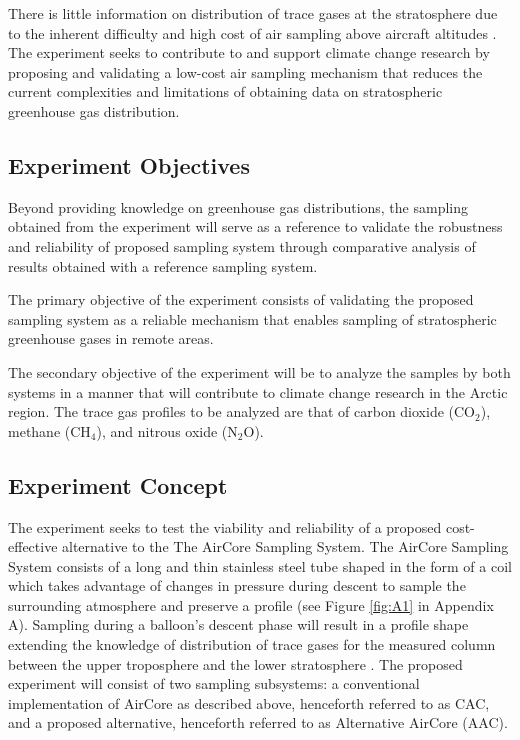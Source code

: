 \documentclass[a4paper,12pt,twoside]{article}
\begin{document}
There is little information on distribution of trace gases at the stratosphere due to the inherent difficulty and high cost of air sampling above aircraft altitudes \cite{Trace}. The experiment seeks to contribute to and support climate change research by proposing and validating a low-cost air sampling mechanism that reduces the current complexities and limitations of obtaining data on stratospheric greenhouse gas distribution.
\pagebreak
\subsection{Experiment Objectives}

Beyond providing knowledge on greenhouse gas distributions, the sampling obtained from the experiment will serve as a reference to validate the robustness and reliability of proposed sampling system through comparative analysis of results obtained with a reference sampling system.

The primary objective of the experiment consists of validating the proposed sampling system as a reliable mechanism that enables sampling of stratospheric greenhouse gases in remote areas.

The secondary objective of the experiment will be to analyze the samples by both systems in a manner that will contribute to climate change research in the Arctic region. The trace gas profiles to be analyzed are that of carbon dioxide (CO$_{2}$), methane (CH$_{4}$), and nitrous oxide (N$_{2}$O). 
\subsection{Experiment Concept}

The experiment seeks to test the viability and reliability of a proposed cost-effective alternative to the The AirCore Sampling System. The AirCore Sampling System consists of a long and thin stainless steel tube shaped in the form of a coil which takes advantage of changes in pressure during descent to sample the surrounding atmosphere and preserve a profile (see Figure \ref{fig:A1} in Appendix A). Sampling during a balloon’s descent phase will result in a profile shape extending the knowledge of distribution of trace gases for the measured column between the upper troposphere and the lower stratosphere \cite{Karion}. The proposed experiment will consist of two sampling subsystems: a conventional implementation of AirCore as described above, henceforth referred to as CAC, and a proposed alternative, henceforth referred to as Alternative AirCore (AAC).
\end{document}
